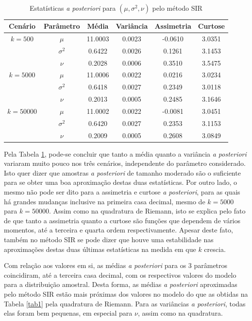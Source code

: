 \begin{table}[t]
	\caption{Estatísticas \textit{a posteriori} para $(\mu, \sigma^2, \nu)$ pelo método SIR}
	\label{tab2}
	\centering
	\begin{tabular}{cccccc}
		\toprule
		Cenário & Parâmetro & Média & Variância & Assimetria & Curtose \\
		\midrule
		$k = 500$ & $\mu$      & 11.0003 & 0.0023 & -0.0610 & 3.0351 \\
		& $\sigma^2$ &  0.6422 & 0.0026 &  0.1261 & 3.1453 \\
		& $\nu$      &  0.2028 & 0.0006 &  0.3510 & 3.5475 \\
		\midrule
		$k = 5000$ & $\mu$      & 11.0006 & 0.0022 &  0.0216 & 3.0234 \\
		& $\sigma^2$ &  0.6418 & 0.0027 &  0.2349 & 3.0118 \\
		& $\nu$      &  0.2013 & 0.0005 &  0.2485 & 3.1646 \\
		\midrule
		$k = 50000$ & $\mu$      & 11.0002 & 0.0022 & -0.0081 & 3.0451 \\
		& $\sigma^2$ &  0.6420 & 0.0027 &  0.2353 & 3.1153 \\
		& $\nu$      &  0.2009 & 0.0005 &  0.2608 & 3.0849 \\
		\bottomrule
	\end{tabular}
\end{table}

Pela Tabela \ref{tab2}, pode-se concluir que tanto a média quanto a variância \textit{a posteriori} variaram muito pouco nos três cenários, independente do parâmetro considerado. Isto quer dizer que amostras \textit{a posteriori} de tamanho moderado são o suficiente para se obter uma boa aproximação destas duas estatísticas. Por outro lado, o mesmo não pode ser dito para a assimetria e curtose \textit{a posteriori}, para as quais há grandes mudanças inclusive na primeira casa decimal, mesmo de $k=5000$ para $k=50000$. Assim como na quadratura de Riemann, isto se explica pelo fato de que tanto a assimetria quanto a curtose são funções que dependem de vários momentos, até a terceira e quarta ordem respectivamente. Apesar deste fato, também no método SIR se pode dizer que houve uma estabilidade nas aproximações destas duas últimas estatísticas na medida em que $k$ crescia.

Com relação aos valores em si, as médias \textit{a posteriori} para os 3 parâmetros coincidiram, até a terceira casa decimal, com os respectivos valores do modelo para a distribuição amostral. Desta forma, as médias \textit{a posteriori} aproximadas pelo método SIR estão mais próximas dos valores no modelo do que as obtidas na Tabela \ref{tab1} pela quadratura de Riemann. Para as variâncias \textit{a posteriori}, todas elas foram bem pequenas, em especial para $\nu$, assim como na quadratura.

